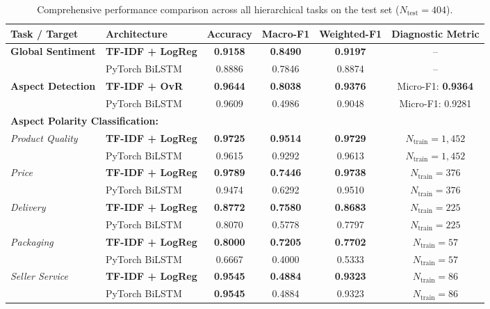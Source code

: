 \documentclass[12pt,a4paper]{article}
\begin{document}
\begin{table}[htbp]
\centering
\caption{Comprehensive performance comparison across all hierarchical tasks on the test set ($N_{\mathrm{test}} = 404$).}
\label{tab:results}
\vspace{0.3cm}
\begin{tabular}{llcccc}
\hline\hline
\textbf{Task / Target} & \textbf{Architecture} & \textbf{Accuracy} & \textbf{Macro-F1} & \textbf{Weighted-F1} & \textbf{Diagnostic Metric} \\
\hline
\multirow{2}{*}{\textbf{Global Sentiment}} 
    & \textbf{TF-IDF + LogReg} & \textbf{0.9158} & \textbf{0.8490} & \textbf{0.9197} & -- \\
    & PyTorch BiLSTM           & 0.8886          & 0.7846          & 0.8874          & -- \\
\hline
\multirow{2}{*}{\textbf{Aspect Detection}} 
    & \textbf{TF-IDF + OvR}    & \textbf{0.9644} & \textbf{0.8038} & \textbf{0.9376} & Micro-F1: \textbf{0.9364} \\
    & PyTorch BiLSTM           & 0.9609          & 0.4986          & 0.9048          & Micro-F1: 0.9281 \\
\hline
\multicolumn{6}{l}{\textbf{Aspect Polarity Classification:}} \\
\textit{Product Quality} & \textbf{TF-IDF + LogReg} & \textbf{0.9725} & \textbf{0.9514} & \textbf{0.9729} & $N_{\mathrm{train}} = 1{,}452$ \\
                        & PyTorch BiLSTM           & 0.9615          & 0.9292          & 0.9613          & $N_{\mathrm{train}} = 1{,}452$ \\
\hline
\textit{Price}           & \textbf{TF-IDF + LogReg} & \textbf{0.9789} & \textbf{0.7446} & \textbf{0.9738} & $N_{\mathrm{train}} = 376$ \\
                        & PyTorch BiLSTM           & 0.9474          & 0.6292          & 0.9510          & $N_{\mathrm{train}} = 376$ \\
\hline
\textit{Delivery}        & \textbf{TF-IDF + LogReg} & \textbf{0.8772} & \textbf{0.7580} & \textbf{0.8683} & $N_{\mathrm{train}} = 225$ \\
                        & PyTorch BiLSTM           & 0.8070          & 0.5778          & 0.7797          & $N_{\mathrm{train}} = 225$ \\
\hline
\textit{Packaging}       & \textbf{TF-IDF + LogReg} & \textbf{0.8000} & \textbf{0.7205} & \textbf{0.7702} & $N_{\mathrm{train}} = 57$ \\
                        & PyTorch BiLSTM           & 0.6667          & 0.4000          & 0.5333          & $N_{\mathrm{train}} = 57$ \\
\hline
\textit{Seller Service}  & \textbf{TF-IDF + LogReg} & \textbf{0.9545} & \textbf{0.4884} & \textbf{0.9323} & $N_{\mathrm{train}} = 86$ \\
                        & PyTorch BiLSTM           & \textbf{0.9545} & 0.4884          & 0.9323          & $N_{\mathrm{train}} = 86$ \\
\hline\hline
\end{tabular}
\end{table}
\end{document}
